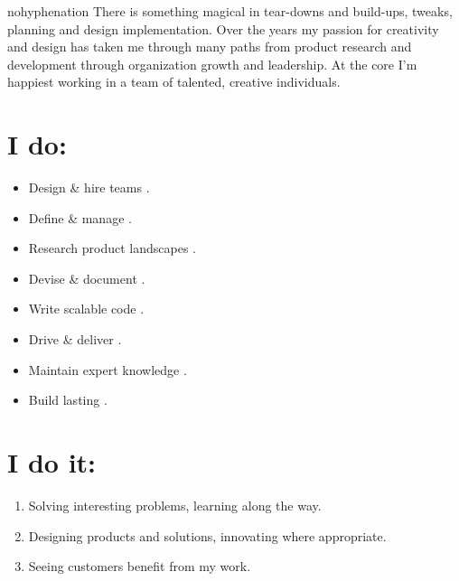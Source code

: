 \maketitle

\displayaddress \begin{sloppypar}\begin{hyphenrules}{nohyphenation} There is something magical in tear-downs and build-ups, tweaks, planning and design implementation. Over the years my passion for creativity and design has taken me through many paths from product research and development through organization growth and leadership. At the core I'm happiest working in a team of talented, creative individuals.\end{hyphenrules}\end{sloppypar}

\section{ I do:}
\begin{itemize}
\itemsep-0.1em
\item{Design \& hire teams .}
\item{Define \& manage .}
\item{Research product landscapes .}
\item{Devise \& document .}
\item{Write scalable code .}
\item{Drive \& deliver .}
\item{Maintain expert knowledge .}
\item{Build lasting .}
\end{itemize}
\smallskip

\section{ I do it:}
\begin{enumerate}
\itemsep-0.1em
\item{Solving interesting problems, learning along the way.}
\item{Designing products and solutions, innovating where appropriate.}
\item{Seeing customers benefit from my work.}
\end{enumerate}
\smallskip

